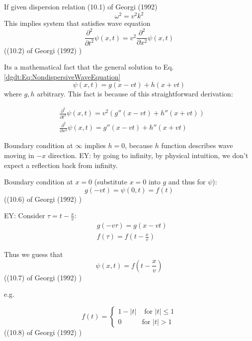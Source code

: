 If given dispersion relation (10.1) of Georgi (1992) \cite{dgdt:Geor1992}
\begin{equation}\label{dgdt:Eq:NondispersiveDispersionRelation}
	\omega^2 = v^2 k^2
\end{equation}
This implies system that satisfies wave equation
\begin{equation}\label{dgdt:Eq:NondispersiveWaveEquation}
	\frac{\partial^2}{\partial t^2} \psi(x,t) = v^2 \frac{\partial^2}{\partial x^2} \psi(x,t)
\end{equation}
((10.2) of Georgi (1992) \cite{dgdt:Geor1992})

Its a mathematical fact that the general solution to Eq. \ref{dgdt:Eq:NondispersiveWaveEquation} 
\begin{equation}
	\psi(x,t) = g(x- vt) + h(x+vt)
\end{equation}
where $g,h $ arbitrary. This fact is because of this straightforward derivation:

\[
\begin{aligned}
& \frac{\partial^2}{ \partial t^2} \psi(x,t) = v^2 (g''(x-vt) + h''(x+vt)) \\
&	\frac{\partial^2}{ \partial x^2} \psi(x,t) = g''(x-vt) + h''(x+vt)
\end{aligned}
\]

Boundary condition at $\infty$ implies $h=0$, because $h$ function describes wave moving in $-x$ direction. EY: by going to infinity, by physical intuition, we don't expect a reflection back from infinity.

Boundary condition at $x=0$ (substitute $x=0$ into $g$ and thus for $\psi$):
\begin{equation}
	g(-vt) = \psi(0,t) = f(t)
\end{equation}
((10.6) of Georgi (1992) \cite{dgdt:Geor1992})

EY: Consider $\tau = t- \frac{x}{v}$:
\[
\begin{aligned}
	& g(-v\tau) = g(x-vt) \\
	& f(\tau) = f(t-\frac{x}{v})
\end{aligned}
\]

Thus we guess that 
\begin{equation}
	\psi(x,t) = f(t- \frac{x}{v})
\end{equation}
((10.7) of Georgi (1992) \cite{dgdt:Geor1992})

e.g. 

\begin{equation}
	f(t) = \begin{cases} 1 - |t| & \text{ for } |t| \leq 1 \\
		0 & \text{for } |t| >1 \end{cases}
\end{equation}
((10.8) of Georgi (1992) \cite{dgdt:Geor1992})

